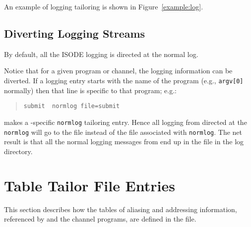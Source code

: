 An example of logging tailoring is shown in Figure~\ref{example:log}.


\subsection{Diverting Logging Streams}\label{sect:divlog}
By default, all the ISODE logging is directed at the normal log.

Notice that for a given program or channel, the logging information
can be diverted.  If a logging entry starts with the name of the
program (e.g., \verb|argv[0]| normally) then that line is specific to
that program; e.g.:
\begin{quote}\small\begin{verbatim}
submit	normlog file=submit
\end{verbatim}\end{quote}
makes a -specific \verb+normlog+ tailoring entry.
Hence all logging from  directed at the \verb+normlog+ will go
to the file  instead of the file associated with
\verb+normlog+. The net result is that all the normal logging messages
from  end up in the file  in the log directory.


\section{Table Tailor File Entries}

This section describes how the tables of aliasing and addressing
information, referenced by  and the channel programs, are
defined in the  file.

